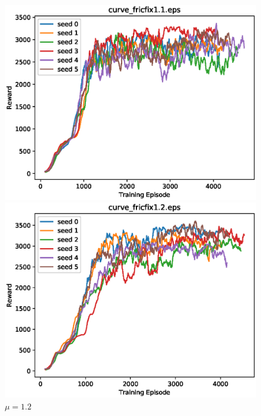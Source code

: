 \clearpage

\begin{figure}[p]
 \begin{minipage}{0.49\hsize}
  \begin{center}
 \includegraphics[width=.99\linewidth]{./fig/curve_fricfix1.1.eps}
  \caption{$\mu=1.1$
  }
  \end{center}
 \end{minipage}
 \begin{minipage}{0.49\hsize}
   \begin{center}
 \includegraphics[width=.99\linewidth]{./fig/curve_fricfix1.2.eps}
  \caption{$\mu=1.2$
     }
  \end{center}
 \end{minipage}
\end{figure}

